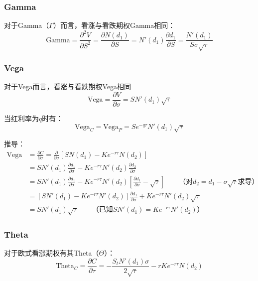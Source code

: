 \documentclass[11pt]{article}
\begin{document}
\subsubsection{Gamma}

对于Gamma（$\Gamma$）而言，看涨与看跌期权Gamma相同：
\begin{equation*}
    \text{Gamma} = \frac{\partial^2 V}{\partial S^2} = \frac{\partial N(d_1)}{\partial S} = N'(d_1)\frac{\partial d_1}{\partial S} = \frac{N'(d_1)}{S\sigma\sqrt{\tau}}
\end{equation*}

\subsubsection{Vega}

对于Vega而言，看涨与看跌期权Vega相同
\begin{equation*}
    \text{Vega} = \frac{\partial V}{\partial \sigma}  = SN'(d_1)\sqrt{\tau}
\end{equation*}

当红利率为$q$时有：
\begin{equation*}
    \text{Vega}_C = \text{Vega}_P = S e^{-q\tau}N'(d_1)\sqrt{\tau}
\end{equation*}

推导：
\begin{align*}
    \text{Vega} &= \frac{\partial C}{\partial \sigma} = \frac{\partial}{\partial \sigma} \left[S N(d_1) - K e^{-r\tau}N(d_2)\right] \\
    &= S N'(d_1) \frac{\partial d_1}{\partial \sigma} - Ke^{-r\tau}N'(d_2) \frac{\partial d_2}{\partial \sigma} \\
    &= S N'(d_1) \frac{\partial d_1}{\partial \sigma} - Ke^{-r\tau}N'(d_2) \left[ \frac{\partial d_1}{\partial \sigma} -\sqrt{\tau} \right] \qquad \text{（对$d_2 = d_1 - \sigma\sqrt{\tau}$求导）} \\
    &= \left[ S N'(d_1) - Ke^{-r\tau}N'(d_2) \right] \frac{\partial d_1}{\partial \sigma} + Ke^{-r\tau}N'(d_2) \sqrt{\tau} \\
    &= S N'(d_1)\sqrt{\tau} \qquad \text{（已知$S N'(d_1) = Ke^{-r\tau}N'(d_2)$）}
\end{align*}

\subsubsection{Theta}

对于欧式看涨期权有其Theta（$\Theta$）：
\begin{equation*}
    \text{Theta}_C = \frac{\partial C}{\partial \tau} = -\frac{S_t N'(d_1)\sigma}{2\sqrt{\tau}} - r K e^{-r\tau}N(d_2)
\end{equation*}
\end{document}
